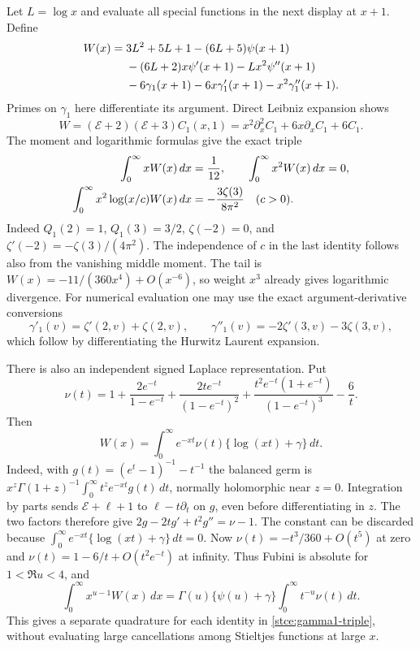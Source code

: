 Let $L=\log x$ and evaluate all special functions in the next display at
$x+1$.  Define
\begin{align}\label{stce:gamma1-explicit}
 W(x)={}&3L^2+5L+1-(6L+5)\psi(x+1)\notag\\
 &-(6L+2)x\psi'(x+1)-Lx^2\psi''(x+1)\notag\\
 &-6\gamma_1(x+1)-6x\gamma'_1(x+1)-x^2\gamma''_1(x+1).
\end{align}
Primes on $\gamma_1$ here differentiate its argument.  Direct Leibniz
expansion shows
\[
 W=(\mathcal E+2)(\mathcal E+3)C_1(x,1)
   =x^2\partial_x^2 C_1+6x\partial_x C_1+6C_1.
\]
The moment and logarithmic formulas give the exact triple
\begin{align}
 \int_0^\infty xW(x)\,dx&=\frac1{12},\qquad
 \int_0^\infty x^2W(x)\,dx=0,\notag\\
 \int_0^\infty x^2\log(x/c)W(x)\,dx
       &=-\frac{3\zeta(3)}{8\pi^2}\quad(c>0).
       \label{stce:gamma1-triple}
\end{align}
Indeed $Q_1(2)=1$, $Q_1(3)=3/2$, $\zeta(-2)=0$, and
$\zeta'(-2)=-\zeta(3)/(4\pi^2)$.  The independence of $c$ in the
last identity follows also from the vanishing middle moment.
The tail is $W(x)=-11/(360x^4)+O(x^{-6})$, so weight $x^3$ already
gives logarithmic divergence.  For numerical evaluation one may use
the exact argument-derivative conversions
\[
 \gamma'_1(v)=\zeta'(2,v)+\zeta(2,v),\qquad
 \gamma''_1(v)=-2\zeta'(3,v)-3\zeta(3,v),
\]
which follow by differentiating the Hurwitz Laurent expansion.

There is also an independent signed Laplace representation.  Put
\[
 \nu(t)=1+\frac{2e^{-t}}{1-e^{-t}}
 +\frac{2te^{-t}}{(1-e^{-t})^2}
 +\frac{t^2e^{-t}(1+e^{-t})}{(1-e^{-t})^3}-\frac6t.
\]
Then
\begin{equation}\label{stce:W-Laplace}
 W(x)=\int_0^\infty e^{-xt}\nu(t)\{\log(xt)+\gamma\}\,dt.
\end{equation}
Indeed, with $g(t)=(e^t-1)^{-1}-t^{-1}$ the balanced germ is
$x^z\Gamma(1+z)^{-1}\int_0^\infty t^ze^{-xt}g(t)\,dt$,
normally holomorphic near $z=0$.  Integration by parts sends
$\mathcal E+\ell+1$ to $\ell-t\partial_t$ on $g$, even before
differentiating in $z$.  The two factors therefore give
$2g-2tg'+t^2g''=\nu-1$.  The constant can be discarded because
$\int_0^\infty e^{-xt}\{\log(xt)+\gamma\}\,dt=0$.
Now $\nu(t)=-t^3/360+O(t^5)$ at zero and
$\nu(t)=1-6/t+O(t^2e^{-t})$ at infinity.  Thus Fubini is absolute for
$1<\Re u<4$, and
\[
 \int_0^\infty x^{u-1}W(x)\,dx
 =\Gamma(u)\{\psi(u)+\gamma\}\int_0^\infty t^{-u}\nu(t)\,dt.
\]
This gives a separate quadrature for each identity in
\eqref{stce:gamma1-triple}, without evaluating large cancellations among
Stieltjes functions at large $x$.

